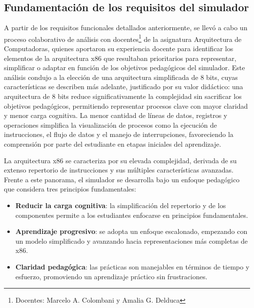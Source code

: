 \documentclass[12pt,oneside]{templates/unerthesis}
\providecommand{\tightlist}{%
  \setlength{\itemsep}{0pt}\setlength{\parskip}{0pt}}
\begin{document}
\hypertarget{fundamentaciuxf3n-de-los-requisitos-del-simulador}{%
\subsection{Fundamentación de los requisitos del simulador}\label{fundamentaciuxf3n-de-los-requisitos-del-simulador}}

A partir de los requisitos funcionales detallados anteriormente, se llevó a cabo un proceso colaborativo de análisis con docentes\footnote{Docentes: Marcelo A. Colombani y Amalia G. Delduca} de la asignatura Arquitectura de Computadoras, quienes aportaron su experiencia docente para identificar los elementos de la arquitectura x86 que resultaban prioritarios para representar, simplificar o adaptar en función de los objetivos pedagógicos del simulador. Este análisis condujo a la elección de una arquitectura simplificada de 8 bits, cuyas características se describen más adelante, justificado por su valor didáctico: una arquitectura de 8 bits reduce significativamente la complejidad sin sacrificar los objetivos pedagógicos, permitiendo representar procesos clave con mayor claridad y menor carga cognitiva. La menor cantidad de líneas de datos, registros y operaciones simplifica la visualización de procesos como la ejecución de instrucciones, el flujo de datos y el manejo de interrupciones, favoreciendo la comprensión por parte del estudiante en etapas iniciales del aprendizaje.

La arquitectura x86 se caracteriza por su elevada complejidad, derivada de su extenso repertorio de instrucciones y sus múltiples características avanzadas. Frente a este panorama, el simulador se desarrolla bajo un enfoque pedagógico que considera tres principios fundamentales:

\begin{itemize}
\tightlist
\item
  \textbf{Reducir la carga cognitiva}: la simplificación del repertorio y de los componentes permite a los estudiantes enfocarse en principios fundamentales.
\item
  \textbf{Aprendizaje progresivo}: se adopta un enfoque escalonado, empezando con un modelo simplificado y avanzando hacia representaciones más completas de x86.
\item
  \textbf{Claridad pedagógica}: las prácticas son manejables en términos de tiempo y esfuerzo, promoviendo un aprendizaje práctico sin frustraciones.
\end{itemize}
\end{document}
